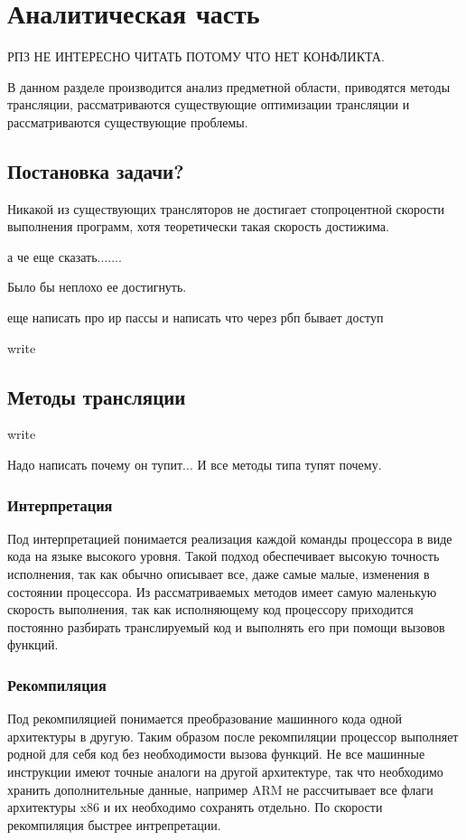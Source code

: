 \section{Аналитическая часть}
 
РПЗ НЕ ИНТЕРЕСНО ЧИТАТЬ ПОТОМУ ЧТО НЕТ КОНФЛИКТА.
 
В данном разделе производится анализ предметной области, приводятся методы трансляции, рассматриваются существующие оптимизации трансляции и рассматриваются существующие проблемы.
 
\subsection{Постановка задачи?}
 
Никакой из существующих трансляторов не достигает стопроцентной скорости выполнения программ, хотя теоретически такая скорость достижима.
 
а че еще сказать.......

Было бы неплохо ее достигнуть.

еще написать про ир пассы
и написать что через рбп бывает доступ

write

\subsection{Методы трансляции}

write

Надо написать почему он тупит... И все методы типа тупят почему.

\subsubsection{Интерпретация}

Под интерпретацией понимается реализация каждой команды процессора в виде кода на языке высокого уровня. Такой подход обеспечивает высокую точность исполнения, так как обычно описывает все, даже самые малые, изменения в состоянии процессора. Из рассматриваемых методов имеет самую маленькую скорость выполнения, так как исполняющему код процессору приходится постоянно разбирать транслируемый код и выполнять его при помощи вызовов функций.

\subsubsection{Рекомпиляция}

Под рекомпиляцией понимается преобразование машинного кода одной архитектуры в другую. Таким образом после рекомпиляции процессор выполняет родной для себя код без необходимости вызова функций. Не все машинные инструкции имеют точные аналоги на другой архитектуре, так что необходимо хранить дополнительные данные, например ARM не рассчитывает все флаги архитектуры x86 и их необходимо сохранять отдельно. По скорости рекомпиляция быстрее интрепретации.

